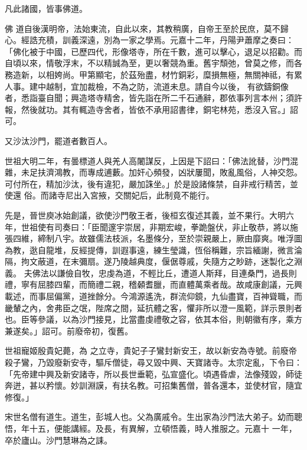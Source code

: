 \begin{pinyinscope}
 凡此諸國，皆事佛道。



 佛
 道自後漢明帝，法始東流，自此以來，其教稍廣，自帝王至於民庶，莫不歸心。經誥充積，訓義深遠，別為一家之學焉。元嘉十二年，丹陽尹蕭摩之奏曰：「佛化被于中國，已歷四代，形像塔寺，所在千數，進可以擊心，退足以招勸。而自頃以來，情敬浮末，不以精誠為至，更以奢競為重。舊宇頹弛，曾莫之修，而各務造新，以相姱尚。甲第顯宅，於茲殆盡，材竹銅彩，糜損無極，無關神祗，有累人事。建中越制，宜加裁檢，不為之防，流道未息。請自今以後，
 有欲鑄銅像者，悉詣臺自聞；興造塔寺精舍，皆先詣在所二千石通辭，郡依事列言本州；須許報，然後就功。其有輒造寺舍者，皆依不承用詔書律，銅宅林苑，悉沒入官。」詔可。



 又沙汰沙門，罷道者數百人。



 世祖大明二年，有曇標道人與羌人高闍謀反，上因是下詔曰：「佛法訛替，沙門混雜，未足扶濟鴻教，而專成逋藪。加奸心頻發，凶狀屢聞，敗亂風俗，人神交怨。可付所在，精加沙汰，後有違犯，嚴加誅坐。」於是設諸條禁，自非戒行精苦，並使還
 俗。而諸寺尼出入宮掖，交關妃后，此制竟不能行。



 先是，晉世庾冰始創議，欲使沙門敬王者，後桓玄復述其義，並不果行。大明六年，世祖使有司奏曰：「臣聞邃宇崇居，非期宏峻，拳跪盤伏，非止敬恭，將以施張四維，締制八宇。故雖儒法枝派，名墨條分，至於崇親嚴上，厥由靡爽。唯浮圖為教，逖自龍堆，反經提傳，訓遐事遠，練生瑩識，恆俗稱難，宗旨緬謝，微言淪隔，拘文蔽道，在末彌扇。遂乃陵越典度，偃倨尊戚，失隨方之眇跡，迷製化之淵義。
 夫佛法以謙儉自牧，忠虔為道，不輕比丘，遭道人斯拜，目連桑門，過長則禮，寧有屈膝四輩，而簡禮二親，稽顙耆臘，而直體萬乘者哉。故咸康創議，元興載述，而事屈偏黨，道挫餘分。今鴻源遙洗，群流仰鏡，九仙盡寶，百神聳職，而畿輦之內，舍弗臣之氓，陛席之間，延抗體之客，懼非所以澄一風範，詳示景則者也。臣等參議，以為沙門接見，比當盡虔禮敬之容，依其本俗，則朝徽有序，乘方兼遂矣。」詔可。前廢帝初，復舊。



 世祖寵姬殷貴妃薨，為
 之立寺，貴妃子子鸞封新安王，故以新安為寺號。前廢帝殺子鸞，乃毀廢新安寺，驅斥僧徒，尋又毀中興、天寶諸寺。太宗定亂，下令曰：「先帝建中興及新安諸寺，所以長世垂範，弘宣盛化。頃遇昏虐，法像殘毀，師徒奔迸，甚以矜懷。妙訓淵謨，有扶名教。可招集舊僧，普各還本，並使材官，隨宜修復。」



 宋世名僧有道生。道生，彭城人也。父為廣戚令。生出家為沙門法大弟子。幼而聰悟，年十五，便能講經。及長，有異解，立頓悟義，時人推服之。元嘉十
 一年，卒於廬山。沙門慧琳為之誄。




\end{pinyinscope}
